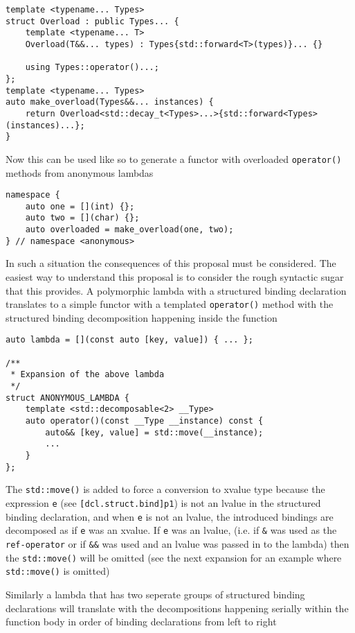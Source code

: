 \documentclass{article}
\begin{document}
\begin{lstlisting}
template <typename... Types>
struct Overload : public Types... {
    template <typename... T>
    Overload(T&&... types) : Types{std::forward<T>(types)}... {}

    using Types::operator()...;
};
template <typename... Types>
auto make_overload(Types&&... instances) {
    return Overload<std::decay_t<Types>...>{std::forward<Types>(instances)...};
}
\end{lstlisting}

Now this can be used like so to generate a functor with overloaded
\texttt{operator()} methods from anonymous lambdas

\begin{lstlisting}
namespace {
    auto one = [](int) {};
    auto two = [](char) {};
    auto overloaded = make_overload(one, two);
} // namespace <anonymous>
\end{lstlisting}

In such a situation the consequences of this proposal must be considered.  The
easiest way to understand this proposal is to consider the rough syntactic
sugar that this provides.  A polymorphic lambda with a structured binding
declaration translates to a simple functor with a templated
\texttt{operator()} method with the structured binding decomposition
happening inside the function

\begin{lstlisting}
auto lambda = [](const auto [key, value]) { ... };

/**
 * Expansion of the above lambda
 */
struct ANONYMOUS_LAMBDA {
    template <std::decomposable<2> __Type>
    auto operator()(const __Type __instance) const {
        auto&& [key, value] = std::move(__instance);
        ...
    }
};
\end{lstlisting}

The \texttt{std::move()} is added to force a conversion to xvalue type because
the expression \texttt{e} (see \texttt{[dcl.struct.bind]p1}) is not an lvalue
in the structured binding declaration, and when \texttt{e} is not an lvalue,
the introduced bindings are decomposed as if \texttt{e} was an xvalue.  If
\texttt{e} was an lvalue, (i.e.  if \texttt{\&} was used as the
\texttt{ref-operator} or if \texttt{\&\&} was used and an lvalue was passed in
to the lambda) then the \texttt{std::move()} will be omitted (see the next
expansion for an example where \texttt{std::move()} is omitted)

Similarly a lambda that has two seperate groups of structured binding
declarations will translate with the decompositions happening serially within
the function body in order of binding declarations from left to right
\end{document}

